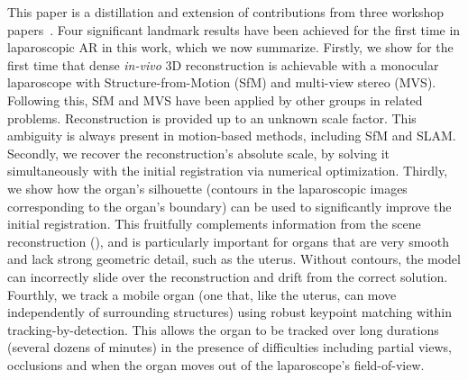 This paper is a distillation and extension of contributions from three workshop papers~\cite{Collins2044,Collins2013,Collins2017System}. Four significant landmark results have been achieved for the first time in laparoscopic AR in this work, which we now summarize. Firstly, we show for the first time that dense \textit{in-vivo} 3D reconstruction is achievable with a monocular laparoscope with Structure-from-Motion (SfM) and multi-view stereo (MVS). Following this, SfM and MVS have been applied by other groups in related problems. Reconstruction is provided up to an unknown scale factor. %
This ambiguity is always present in motion-based methods, including SfM and SLAM. %
Secondly, we recover the reconstruction's absolute scale, by solving it simultaneously with the initial registration via numerical optimization. %
Thirdly, we show how the organ's silhouette (contours in the laparoscopic images corresponding to the organ's boundary) can be used to significantly improve the initial registration. This  fruitfully complements information from the scene reconstruction (),  and is particularly important for organs that are very smooth and lack strong geometric detail, such as the uterus. Without contours, the model can incorrectly slide over the reconstruction and drift from the correct solution. Fourthly, we track a mobile organ (one that, like the uterus, can move independently of surrounding structures) using robust keypoint matching within tracking-by-detection. This allows the organ to be tracked over long durations (several dozens of minutes) in the presence of difficulties including partial views, occlusions and when the organ moves out of the laparoscope's field-of-view.

